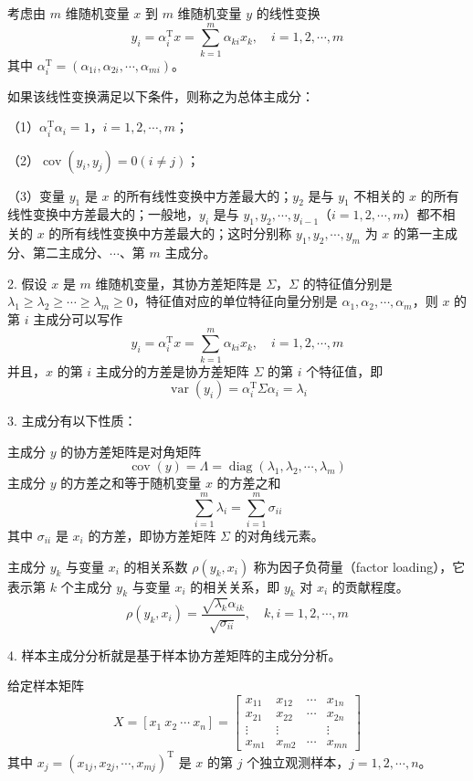 \documentclass[UTF8,12pt,a4paper,fontset=fandol]{ctexart}
\begin{document}
考虑由 $m$ 维随机变量 $x$ 到 $m$ 维随机变量 $y$ 的线性变换
\[
y_i=\alpha_i^{\mathrm{T}}x=\sum_{k=1}^m\alpha_{ki}x_k,\quad i=1,2,\cdots,m
\]
其中 $\alpha_i^{\mathrm{T}}=(\alpha_{1i},\alpha_{2i},\cdots,\alpha_{mi})$。

如果该线性变换满足以下条件，则称之为总体主成分：

（1）$\alpha_i^{\mathrm{T}}\alpha_i=1$，$i=1,2,\cdots,m$；

（2）$\operatorname{cov}(y_i,y_j)=0(i\neq j)$；

（3）变量 $y_1$ 是 $x$ 的所有线性变换中方差最大的；$y_2$ 是与 $y_1$ 不相关的 $x$ 的所有线性变换中方差最大的；一般地，$y_i$ 是与 $y_1,y_2,\cdots,y_{i-1}$（$i=1,2,\cdots,m$）都不相关的 $x$ 的所有线性变换中方差最大的；这时分别称 $y_1,y_2,\cdots,y_m$ 为 $x$ 的第一主成分、第二主成分、$\cdots$、第 $m$ 主成分。

2. 假设 $x$ 是 $m$ 维随机变量，其协方差矩阵是 $\Sigma$，$\Sigma$ 的特征值分别是 $\lambda_1\geqslant\lambda_2\geqslant\cdots\geqslant\lambda_m\geqslant0$，特征值对应的单位特征向量分别是 $\alpha_1,\alpha_2,\cdots,\alpha_m$，则 $x$ 的第 $i$ 主成分可以写作
\[
y_i=\alpha_i^{\mathrm{T}}x=\sum_{k=1}^m\alpha_{ki}x_k,\quad i=1,2,\cdots,m
\]
并且，$x$ 的第 $i$ 主成分的方差是协方差矩阵 $\Sigma$ 的第 $i$ 个特征值，即
\[
\operatorname{var}(y_i)=\alpha_i^{\mathrm{T}}\Sigma\alpha_i=\lambda_i
\]

3. 主成分有以下性质：

主成分 $y$ 的协方差矩阵是对角矩阵
\[
\operatorname{cov}(y)=\Lambda=\operatorname{diag}(\lambda_1,\lambda_2,\cdots,\lambda_m)
\]
主成分 $y$ 的方差之和等于随机变量 $x$ 的方差之和
\[
\sum_{i=1}^m\lambda_i=\sum_{i=1}^m\sigma_{ii}
\]
其中 $\sigma_{ii}$ 是 $x_i$ 的方差，即协方差矩阵 $\Sigma$ 的对角线元素。

主成分 $y_k$ 与变量 $x_i$ 的相关系数 $\rho(y_k,x_i)$ 称为因子负荷量（factor loading），它表示第 $k$ 个主成分 $y_k$ 与变量 $x_i$ 的相关关系，即 $y_k$ 对 $x_i$ 的贡献程度。
\[
\rho(y_k,x_i)=\frac{\sqrt{\lambda_k}\alpha_{ik}}{\sqrt{\sigma_{ii}}},\quad k,i=1,2,\cdots,m
\]

4. 样本主成分分析就是基于样本协方差矩阵的主成分分析。

给定样本矩阵
\[
X=[x_1\ x_2\ \cdots\ x_n]=
\begin{bmatrix}
x_{11} & x_{12} & \cdots & x_{1n}\\
x_{21} & x_{22} & \cdots & x_{2n}\\
\vdots & \vdots & & \vdots\\
x_{m1} & x_{m2} & \cdots & x_{mn}
\end{bmatrix}
\]
其中 $x_j=(x_{1j},x_{2j},\cdots,x_{mj})^{\mathrm{T}}$ 是 $x$ 的第 $j$ 个独立观测样本，$j=1,2,\cdots,n$。
\end{document}

